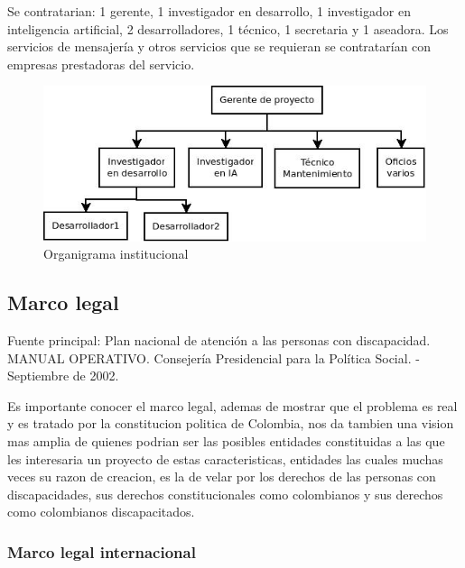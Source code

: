 \documentclass[a4paper, 12pt, oneside]{article}
\begin{document}
	Se contratarian: 1 gerente, 1 investigador en desarrollo, 1 investigador en inteligencia artificial, 2 desarrolladores, 1 técnico, 1 secretaria y 1 aseadora. Los servicios de mensajería y otros servicios que se requieran se contratarían con empresas prestadoras del servicio.
		
	\begin{figure}
	\begin{center}
	\leavevmode
	\includegraphics[width=12cm]{img/org.jpg}
	\end{center}
	\caption{Organigrama institucional}
	\label{fig:org}
	\end{figure}
	
		
	\subsection{Marco legal}

	Fuente principal: Plan nacional de atención a las personas con discapacidad. MANUAL OPERATIVO. Consejería Presidencial para la Política Social. - Septiembre de 2002.

	Es importante conocer el marco legal, ademas de mostrar que el problema es real y es tratado por la constitucion politica de Colombia, nos da tambien una vision mas amplia de quienes podrian ser las posibles entidades constituidas a las que les interesaria un proyecto de estas caracteristicas, entidades las cuales muchas veces su razon de creacion, es la de velar por los derechos de las personas con discapacidades, sus derechos constitucionales como colombianos y sus derechos como colombianos discapacitados. 


	\subsubsection{Marco legal internacional}
\end{document}
